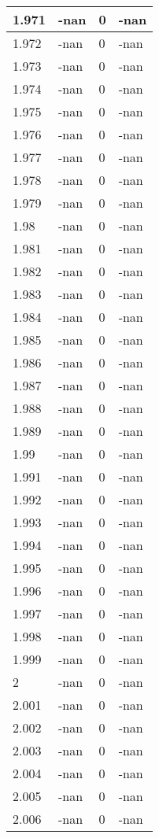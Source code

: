 \documentclass[a4paper,14pt]{extarticle}
\begin{document}
\begin{longtable}{||m{3cm}||m{3cm}|m{3cm}||m{3cm}||}
\hline
1.971 & -nan & 0 & -nan\\
\hline
1.972 & -nan & 0 & -nan\\
\hline
1.973 & -nan & 0 & -nan\\
\hline
1.974 & -nan & 0 & -nan\\
\hline
1.975 & -nan & 0 & -nan\\
\hline
1.976 & -nan & 0 & -nan\\
\hline
1.977 & -nan & 0 & -nan\\
\hline
1.978 & -nan & 0 & -nan\\
\hline
1.979 & -nan & 0 & -nan\\
\hline
1.98 & -nan & 0 & -nan\\
\hline
1.981 & -nan & 0 & -nan\\
\hline
1.982 & -nan & 0 & -nan\\
\hline
1.983 & -nan & 0 & -nan\\
\hline
1.984 & -nan & 0 & -nan\\
\hline
1.985 & -nan & 0 & -nan\\
\hline
1.986 & -nan & 0 & -nan\\
\hline
1.987 & -nan & 0 & -nan\\
\hline
1.988 & -nan & 0 & -nan\\
\hline
1.989 & -nan & 0 & -nan\\
\hline
1.99 & -nan & 0 & -nan\\
\hline
1.991 & -nan & 0 & -nan\\
\hline
1.992 & -nan & 0 & -nan\\
\hline
1.993 & -nan & 0 & -nan\\
\hline
1.994 & -nan & 0 & -nan\\
\hline
1.995 & -nan & 0 & -nan\\
\hline
1.996 & -nan & 0 & -nan\\
\hline
1.997 & -nan & 0 & -nan\\
\hline
1.998 & -nan & 0 & -nan\\
\hline
1.999 & -nan & 0 & -nan\\
\hline
2 & -nan & 0 & -nan\\
\hline
2.001 & -nan & 0 & -nan\\
\hline
2.002 & -nan & 0 & -nan\\
\hline
2.003 & -nan & 0 & -nan\\
\hline
2.004 & -nan & 0 & -nan\\
\hline
2.005 & -nan & 0 & -nan\\
\hline
2.006 & -nan & 0 & -nan\\

\end{longtable}
\end{document}
